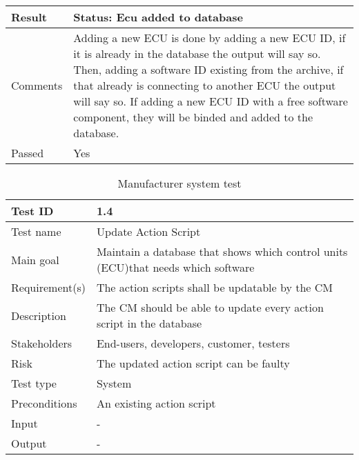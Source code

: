 \begin{table}[H]
\begin{tabularx}{1.0\textwidth}{
    |p{}     %
    |p{}|    %
}
Result
& Status: Ecu added to database
\\
\hline

Comments
& Adding a new ECU is done by adding a new ECU ID, if it is already in the database the output will say so. Then, adding a software ID existing from the archive, if that already is connecting to another ECU the output will say so. If adding a new ECU ID with a free software component, they will be binded and added to the database.
\\
\hline

Passed
& Yes
\\
\hline

\end{tabularx}
\end{table}

\begin{table}[H]
\centering
\caption{Manufacturer system test}
\begin{tabularx}{1.0\textwidth}{
    |p{}     %
    |p{}|    %
}
\hline

Test ID
& 1.4
\\
\hline

Test name
& Update Action Script
\\
\hline

Main goal
& Maintain a database that shows which control units (ECU)that needs which software
\\
\hline

Requirement(s)
& The action scripts shall be updatable by the CM
\\
\hline

Description
& The CM should be able to update every action script in the database
\\
\hline

Stakeholders
& End-users, developers, customer, testers
\\
\hline

Risk
& The updated action script can be faulty
\\
\hline

Test type
& System
\\
\hline

Preconditions
& An existing action script
\\
\hline

Input
& -
\\
\hline

Output
& -
\\
\hline


\end{tabularx}
\end{table}
